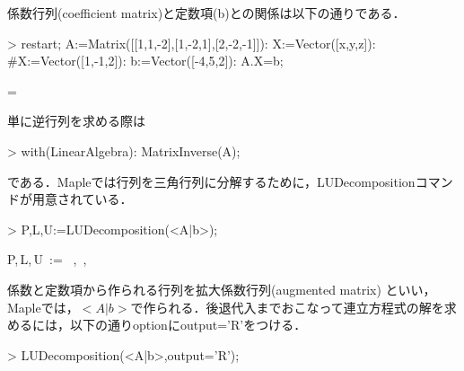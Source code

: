 係数行列(coefficient matrix)と定数項(b)との関係は以下の通りである．
\begin{MapleInput}
> restart; 
  A:=Matrix([[1,1,-2],[1,-2,1],[2,-2,-1]]): 
  X:=Vector([x,y,z]):
  #X:=Vector([1,-1,2]):
  b:=Vector([-4,5,2]): 
  A.X=b;
\end{MapleInput}
\begin{MapleOutput}
\left[ \begin {array}{c} x+y-2\,z\\ x-2\,y+z\\ 2\,x-2\,y-z\end {array} \right] = \left[ \begin {array}{c} -4\\ 5\\ 2\end {array} \right]
\end{MapleOutput}
単に逆行列を求める際は
\begin{MapleInput}
> with(LinearAlgebra): 
  MatrixInverse(A);
\end{MapleInput}
\begin{MapleOutput}
\end{MapleOutput}
である．Mapleでは行列を三角行列に分解するために，LUDecompositionコマンドが用意されている．\begin{MapleInput}
> P,L,U:=LUDecomposition(<A|b>);
\end{MapleInput}
\begin{MapleOutput}
P,\,L,\,U\, := \,  ,\,  ,\, 
\end{MapleOutput}
係数と定数項から作られる行列を拡大係数行列(augmented matrix) といい，Mapleでは，$<A|b>$で作られる．後退代入までおこなって連立方程式の解を求めるには，以下の通りoptionにoutput='R'をつける．
\begin{MapleInput}
> LUDecomposition(<A|b>,output='R');
\end{MapleInput}
\begin{MapleOutput}
\end{MapleOutput}

